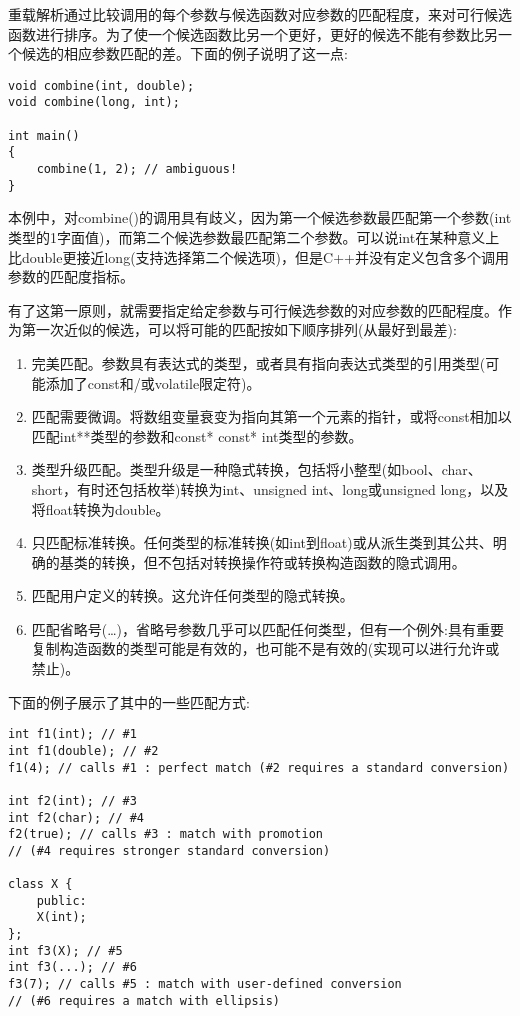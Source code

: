 
重载解析通过比较调用的每个参数与候选函数对应参数的匹配程度，来对可行候选函数进行排序。为了使一个候选函数比另一个更好，更好的候选不能有参数比另一个候选的相应参数匹配的差。下面的例子说明了这一点:

\begin{lstlisting}[style=styleCXX]
void combine(int, double);
void combine(long, int);

int main()
{
	combine(1, 2); // ambiguous!
}
\end{lstlisting}

本例中，对combine()的调用具有歧义，因为第一个候选参数最匹配第一个参数(int类型的1字面值)，而第二个候选参数最匹配第二个参数。可以说int在某种意义上比double更接近long(支持选择第二个候选项)，但是C++并没有定义包含多个调用参数的匹配度指标。

有了这第一原则，就需要指定给定参数与可行候选参数的对应参数的匹配程度。作为第一次近似的候选，可以将可能的匹配按如下顺序排列(从最好到最差):

\begin{enumerate}
\item 
完美匹配。参数具有表达式的类型，或者具有指向表达式类型的引用类型(可能添加了const和/或volatile限定符)。

\item 
匹配需要微调。将数组变量衰变为指向其第一个元素的指针，或将const相加以匹配int**类型的参数和const* const* int类型的参数。


\item 
类型升级匹配。类型升级是一种隐式转换，包括将小整型(如bool、char、short，有时还包括枚举)转换为int、unsigned int、long或unsigned long，以及将float转换为double。


\item 
只匹配标准转换。任何类型的标准转换(如int到float)或从派生类到其公共、明确的基类的转换，但不包括对转换操作符或转换构造函数的隐式调用。


\item 
匹配用户定义的转换。这允许任何类型的隐式转换。


\item 
匹配省略号(…)，省略号参数几乎可以匹配任何类型，但有一个例外:具有重要复制构造函数的类型可能是有效的，也可能不是有效的(实现可以进行允许或禁止)。
\end{enumerate}

下面的例子展示了其中的一些匹配方式:

\begin{lstlisting}[style=styleCXX]
int f1(int); // #1
int f1(double); // #2
f1(4); // calls #1 : perfect match (#2 requires a standard conversion)

int f2(int); // #3
int f2(char); // #4
f2(true); // calls #3 : match with promotion
// (#4 requires stronger standard conversion)

class X {
	public:
	X(int);
};
int f3(X); // #5
int f3(...); // #6
f3(7); // calls #5 : match with user-defined conversion
// (#6 requires a match with ellipsis)
\end{lstlisting}


